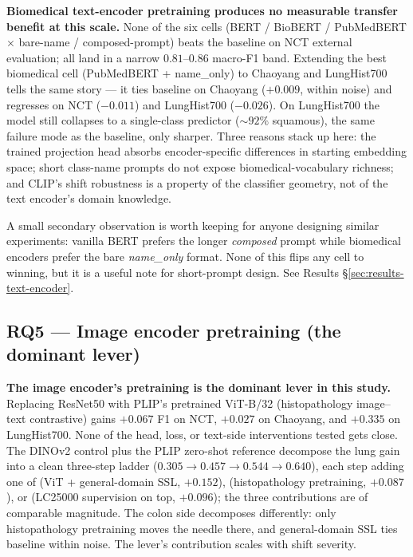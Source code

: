 \textbf{Biomedical text-encoder pretraining produces no measurable transfer benefit at this scale.} None of the six cells (BERT / BioBERT / PubMedBERT $\times$ bare-name / composed-prompt) beats the baseline on NCT external evaluation; all land in a narrow $0.81$--$0.86$ macro-F1 band. Extending the best biomedical cell (PubMedBERT + name\_only) to Chaoyang and LungHist700 tells the same story --- it ties baseline on Chaoyang ($+0.009$, within noise) and regresses on NCT ($-0.011$) and LungHist700 ($-0.026$). On LungHist700 the model still collapses to a single-class predictor ($\sim 92\%$ squamous), the same failure mode as the baseline, only sharper. Three reasons stack up here: the trained projection head absorbs encoder-specific differences in starting embedding space; short class-name prompts do not expose biomedical-vocabulary richness; and CLIP's shift robustness is a property of the classifier geometry, not of the text encoder's domain knowledge.

A small secondary observation is worth keeping for anyone designing similar experiments: vanilla BERT prefers the longer \emph{composed} prompt while biomedical encoders prefer the bare \emph{name\_only} format. None of this flips any cell to winning, but it is a useful note for short-prompt design. See Results §\ref{sec:results-text-encoder}.

\subsection*{RQ5 --- Image encoder pretraining (the dominant lever)}

\textbf{The image encoder's pretraining is the dominant lever in this study.} Replacing ResNet50 with PLIP's pretrained ViT-B/32 (histopathology image--text contrastive) gains $+0.067$ F1 on NCT, $+0.027$ on Chaoyang, and $+0.335$ on LungHist700. None of the head, loss, or text-side interventions tested gets close. The DINOv2 control plus the PLIP zero-shot reference decompose the lung gain into a clean three-step ladder ($0.305 \to 0.457 \to 0.544 \to 0.640$), each step adding one of (ViT + general-domain SSL, $+0.152$), (histopathology pretraining, $+0.087$), or (LC25000 supervision on top, $+0.096$); the three contributions are of comparable magnitude. The colon side decomposes differently: only histopathology pretraining moves the needle there, and general-domain SSL ties baseline within noise. The lever's contribution scales with shift severity.

